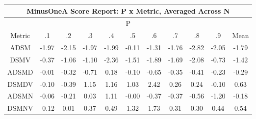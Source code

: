 \documentclass[11pt,a4paper]{report}
\begin{document}
\begin{longtable}{ | c || c | c | c | c | c | c | c | c | c || c |}
\hline
\multicolumn{11}{|c|}{ MinusOneA Score Report: P x Metric, Averaged Across N } \\
\hline
\multicolumn{11}{|c|}{ P } \\
\hline
Metric & .1 & .2 & .3 & .4 & .5 & .6 & .7 & .8 & .9 & Mean\\
\hline
\hline
\endhead
ADSM &  \cellcolor[HTML]{FFCFCF} -1.97 &  \cellcolor[HTML]{FFC7C7} -2.15 &  \cellcolor[HTML]{FFCFCF} -1.97 &  \cellcolor[HTML]{FFCFCF} -1.99 &  \cellcolor[HTML]{FFFFFF} -0.11 &  \cellcolor[HTML]{FFDFDF} -1.31 &  \cellcolor[HTML]{FFCFCF} -1.76 &  \cellcolor[HTML]{FFB7B7} -2.82 &  \cellcolor[HTML]{FFCFCF} -2.05 &  \cellcolor[HTML]{FFCFCF} -1.79 \\
DSMV &  \cellcolor[HTML]{FFF7F7} -0.37 &  \cellcolor[HTML]{FFE7E7} -1.06 &  \cellcolor[HTML]{FFE7E7} -1.10 &  \cellcolor[HTML]{FFC7C7} -2.36 &  \cellcolor[HTML]{FFD7D7} -1.51 &  \cellcolor[HTML]{FFCFCF} -1.89 &  \cellcolor[HTML]{FFD7D7} -1.69 &  \cellcolor[HTML]{FFC7C7} -2.08 &  \cellcolor[HTML]{FFEFEF} -0.73 &  \cellcolor[HTML]{FFDFDF} -1.42 \\
ADSMD &  \cellcolor[HTML]{FFFFFF} -0.01 &  \cellcolor[HTML]{FFF7F7} -0.32 &  \cellcolor[HTML]{FFEFEF} -0.71 &  \cellcolor[HTML]{F7F7FF} 0.18 &  \cellcolor[HTML]{FFFFFF} -0.10 &  \cellcolor[HTML]{FFEFEF} -0.65 &  \cellcolor[HTML]{FFF7F7} -0.35 &  \cellcolor[HTML]{FFF7F7} -0.41 &  \cellcolor[HTML]{FFF7F7} -0.23 &  \cellcolor[HTML]{FFF7F7} -0.29 \\
DSMDV &  \cellcolor[HTML]{FFFFFF} -0.10 &  \cellcolor[HTML]{FFF7F7} -0.39 &  \cellcolor[HTML]{DFDFFF} 1.15 &  \cellcolor[HTML]{DFDFFF} 1.16 &  \cellcolor[HTML]{E7E7FF} 1.03 &  \cellcolor[HTML]{BFBFFF} 2.42 &  \cellcolor[HTML]{F7F7FF} 0.26 &  \cellcolor[HTML]{F7F7FF} 0.24 &  \cellcolor[HTML]{FFFFFF} -0.10 &  \cellcolor[HTML]{EFEFFF} 0.63 \\
ADSMN &  \cellcolor[HTML]{FFFFFF} -0.06 &  \cellcolor[HTML]{FFF7F7} -0.21 &  \cellcolor[HTML]{FFFFFF} 0.03 &  \cellcolor[HTML]{E7E7FF} 1.11 &  \cellcolor[HTML]{FFFFFF} -0.00 &  \cellcolor[HTML]{FFF7F7} -0.37 &  \cellcolor[HTML]{FFF7F7} -0.37 &  \cellcolor[HTML]{FFEFEF} -0.56 &  \cellcolor[HTML]{FFDFDF} -1.20 &  \cellcolor[HTML]{FFF7F7} -0.18 \\
DSMNV &  \cellcolor[HTML]{FFFFFF} -0.12 &  \cellcolor[HTML]{FFFFFF} 0.01 &  \cellcolor[HTML]{F7F7FF} 0.37 &  \cellcolor[HTML]{EFEFFF} 0.49 &  \cellcolor[HTML]{DFDFFF} 1.32 &  \cellcolor[HTML]{D7D7FF} 1.73 &  \cellcolor[HTML]{F7F7FF} 0.31 &  \cellcolor[HTML]{F7F7FF} 0.30 &  \cellcolor[HTML]{F7F7FF} 0.44 &  \cellcolor[HTML]{EFEFFF} 0.54 \\

\end{longtable}
\end{document}
